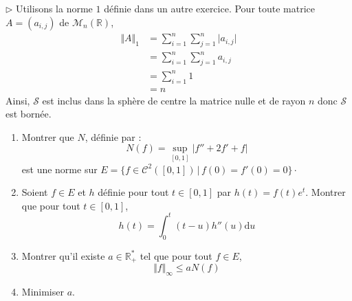 \documentclass[a4paper,10pt]{report}
\begin{document}
\medskip

\noindent $\rhd$ Utilisons la norme $1$ définie dans un autre exercice. Pour toute matrice $A=(a_{i,j})$ de $\mathcal{M}_n(\mathbb{R})$,
\begin{align*}
\Vert A \Vert_1 & = \sum_{i = 1}^{n} \sum_{j = 1}^{n} \vert a_{i,j} \vert \\
& = \sum_{i = 1}^{n} \sum_{j = 1}^{n}  a_{i,j}  \\
 & = \sum_{i = 1}^{n} 1 \\
 & = n
\end{align*}
Ainsi, $\mathcal{S}$ est inclus dans la sphère de centre la matrice nulle et de rayon $n$ donc $\mathcal{S}$ est bornée.

\begin{Exercice}{}
\begin{enumerate}
\item Montrer que $N$, définie par :
$$ N(f) = \sup_{[0,1]} \vert f''+2f'+f \vert $$
est une norme sur $E = \lbrace f \in \mathcal{C}^2([0,1]) \, \vert \, f(0)=f'(0)=0 \rbrace \cdot$
\item Soient $f \in E$ et $h$ définie pour tout $t \in [0,1]$ par $h(t)=f(t)e^t$. Montrer que pour tout $t \in [0,1]$,
$$ h(t) = \int_{0}^t (t-u) h''(u) \textrm{d}u$$
\item Montrer qu'il existe $a \in \mathbb{R}_+^{*}$ tel que pour tout $f \in E$,
$$ \Vert f \Vert_{\infty} \leq a N(f)$$
\item Minimiser $a$.
\end{enumerate}
\end{Exercice}
\end{document}
